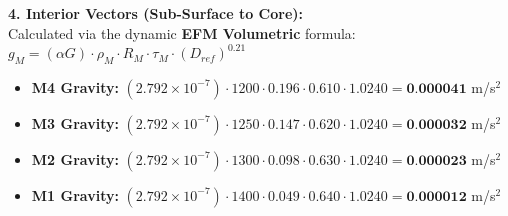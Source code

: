 \documentclass[11pt, a4paper]{article}
\begin{document}
  \vspace{0.5em}
  \noindent \textbf{4. Interior Vectors (Sub-Surface to Core):} \\[0.5em]
  \hspace*{1em} Calculated via the dynamic \textbf{EFM Volumetric} formula: $g_M = (\alpha G) \cdot \rho_{M} \cdot R_M \cdot \tau_M \cdot (D_{ref})^{0.21}$
  \begin{itemize}
    \item \textbf{M4 Gravity:} $(2.792 \times 10^{-7}) \cdot 1200 \cdot 0.196 \cdot 0.610 \cdot 1.0240 = \textbf{0.000041}$ m/s$^2$
    \item \textbf{M3 Gravity:} $(2.792 \times 10^{-7}) \cdot 1250 \cdot 0.147 \cdot 0.620 \cdot 1.0240 = \textbf{0.000032}$ m/s$^2$
    \item \textbf{M2 Gravity:} $(2.792 \times 10^{-7}) \cdot 1300 \cdot 0.098 \cdot 0.630 \cdot 1.0240 = \textbf{0.000023}$ m/s$^2$
    \item \textbf{M1 Gravity:} $(2.792 \times 10^{-7}) \cdot 1400 \cdot 0.049 \cdot 0.640 \cdot 1.0240 = \textbf{0.000012}$ m/s$^2$
  \end{itemize}
\end{document}
